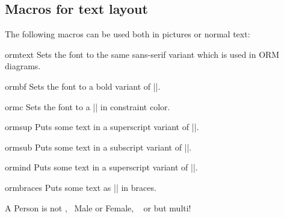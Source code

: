 \documentclass[a4paper,10pt]{article}
\begin{document}
\begin{codeexample}[]
\end{codeexample}


\subsection{Macros for text layout} 
\label{sec:ormtext}
The following macros can be used both in \tikzname{} pictures or normal text:

\begin{command}{ormtext}
Sets the font to the same sans-serif variant which is used in ORM diagrams.
\end{command}

\begin{command}{ormbf}
Sets the font to a bold variant of |\ormtext|.
\end{command}

\begin{command}{ormc}
Sets the font to a |\ormtext| in constraint color.
\end{command}

\begin{command}{ormsup}
Puts some text in a superscript variant of |\ormtext|.
\end{command}

\begin{command}{ormsub}
Puts some text in a subscript variant of |\ormtext|.
\end{command}

\begin{command}{ormind}
Puts some text in a superscript variant of |\ormbf|.
\end{command}

\begin{command}{ormbraces}
Puts some text as |\ormtext| in braces.
\end{command}

\begin{codeexample}[]
A {\ormtext Person} is not ,~
{\ormc Male} {\ormbf or} {\ormtext Female}, ~
{\ormbf or}  but multi!
\end{codeexample}
\end{document}

